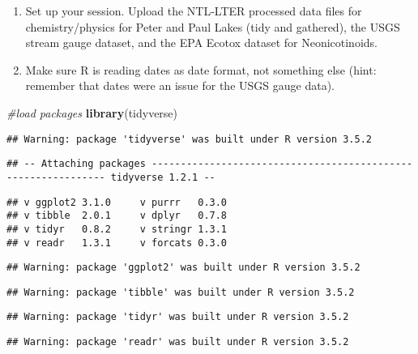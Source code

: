 \documentclass[]{article}
\newenvironment{Shaded}{\begin{snugshade}}{\end{snugshade}}
\newcommand{\KeywordTok}[1]{\textcolor[rgb]{0.13,0.29,0.53}{\textbf{#1}}}
\newcommand{\CommentTok}[1]{\textcolor[rgb]{0.56,0.35,0.01}{\textit{#1}}}
\newcommand{\NormalTok}[1]{#1}
\begin{document}
\begin{enumerate}
\def\labelenumi{\arabic{enumi}.}
\item
  Set up your session. Upload the NTL-LTER processed data files for
  chemistry/physics for Peter and Paul Lakes (tidy and gathered), the
  USGS stream gauge dataset, and the EPA Ecotox dataset for
  Neonicotinoids.
\item
  Make sure R is reading dates as date format, not something else (hint:
  remember that dates were an issue for the USGS gauge data).
\end{enumerate}

\begin{Shaded}
\begin{Highlighting}[]
\CommentTok{#load packages}
\KeywordTok{library}\NormalTok{(tidyverse)}
\end{Highlighting}
\end{Shaded}

\begin{verbatim}
## Warning: package 'tidyverse' was built under R version 3.5.2
\end{verbatim}

\begin{verbatim}
## -- Attaching packages -------------------------------------------------------------- tidyverse 1.2.1 --
\end{verbatim}

\begin{verbatim}
## v ggplot2 3.1.0     v purrr   0.3.0
## v tibble  2.0.1     v dplyr   0.7.8
## v tidyr   0.8.2     v stringr 1.3.1
## v readr   1.3.1     v forcats 0.3.0
\end{verbatim}

\begin{verbatim}
## Warning: package 'ggplot2' was built under R version 3.5.2
\end{verbatim}

\begin{verbatim}
## Warning: package 'tibble' was built under R version 3.5.2
\end{verbatim}

\begin{verbatim}
## Warning: package 'tidyr' was built under R version 3.5.2
\end{verbatim}

\begin{verbatim}
## Warning: package 'readr' was built under R version 3.5.2
\end{verbatim}
\end{document}
